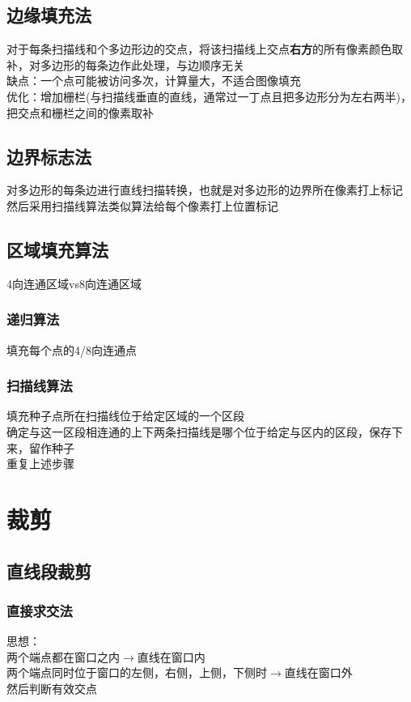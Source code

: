 \documentclass{article}
\begin{document}
\begin{CJK}{UTF8}{gbsn}
	\subsection{边缘填充法}
	对于每条扫描线和个多边形边的交点，将该扫描线上交点\textbf{右方}的所有像素颜色取补，对多边形的每条边作此处理，与边顺序无关\\
	缺点：一个点可能被访问多次，计算量大，不适合图像填充\\
	优化：增加栅栏(与扫描线垂直的直线，通常过一丁点且把多边形分为左右两半)，把交点和栅栏之间的像素取补\\
	\subsection{边界标志法}
	对多边形的每条边进行直线扫描转换，也就是对多边形的边界所在像素打上标记\\
	然后采用扫描线算法类似算法给每个像素打上位置标记\\
	\subsection{区域填充算法}
	4向连通区域vs8向连通区域\\
	\subsubsection{递归算法}
	填充每个点的4/8向连通点\\
	\subsubsection{扫描线算法}
	填充种子点所在扫描线位于给定区域的一个区段\\
	确定与这一区段相连通的上下两条扫描线是哪个位于给定与区内的区段，保存下来，留作种子\\
	重复上述步骤\\

	
\section{裁剪}
\subsection{直线段裁剪}
\subsubsection{直接求交法}
	思想：\\
两个端点都在窗口之内$\rightarrow$直线在窗口内\\
两个端点同时位于窗口的左侧，右侧，上侧，下侧时$\rightarrow$直线在窗口外\\
然后判断有效交点\\

\end{CJK}
\end{document}
